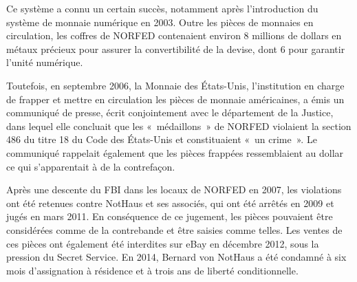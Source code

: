 Ce système a connu un certain succès, notamment après l'introduction du système de monnaie numérique en 2003. Outre les pièces de monnaies en circulation, les coffres de NORFED contenaient environ 8 millions de dollars en métaux précieux pour assurer la convertibilité de la devise, dont 6 pour garantir l'unité numérique.

Toutefois, en septembre 2006, la Monnaie des États-Unis, l'institution en charge de frapper et mettre en circulation les pièces de monnaie américaines, a émis un communiqué de presse, écrit conjointement avec le département de la Justice, dans lequel elle concluait que les «~médaillons~» de NORFED violaient la section 486 du titre 18 du Code des États-Unis et constituaient «~un crime~». Le communiqué rappelait également que les pièces frappées ressemblaient au dollar ce qui s'apparentait à de la contrefaçon.

Après une descente du FBI dans les locaux de NORFED en 2007, les violations ont été retenues contre NotHaus et ses associés, qui ont été arrêtés en 2009 et jugés en mars 2011. En conséquence de ce jugement, les pièces pouvaient être considérées comme de la contrebande et être saisies comme telles. Les ventes de ces pièces ont également été interdites sur eBay en décembre 2012, sous la pression du Secret Service. En 2014, Bernard von NotHaus a été condamné à six mois d'assignation à résidence et à trois ans de liberté conditionnelle.

